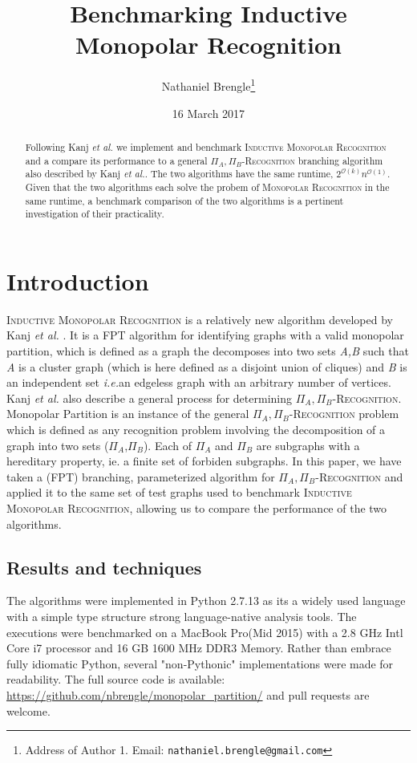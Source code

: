 \documentclass[11pt]{article}
\date{16 March 2017}
\title{Benchmarking Inductive Monopolar Recognition}
\author{{\sc Nathaniel Brengle}\thanks{Address of Author 1. Email: {\tt nathaniel.brengle@gmail.com}}}
\newcommand{\Oh}{{\mathcal O}}
\def\ie{{\em i.e.}}
\begin{document}
\maketitle

\begin{abstract}
Following Kanj \textit{et al.} \cite{ref1} we implement and benchmark \textsc{Inductive Monopolar Recognition} and a compare its performance to a general \textsc{$\Pi_A,\Pi_B$-Recognition} branching algorithm also described by Kanj \textit{et al.}. The two algorithms have the same runtime, $2^{\Oh(k)}n^{\Oh(1)}$. Given that the two algorithms each solve the probem of \textsc{Monopolar Recognition} in the same runtime, a benchmark comparison of the two algorithms is a pertinent investigation of their practicality.

\end{abstract}



\section{Introduction}
\label{sec:intro}
\textsc{Inductive Monopolar Recognition} is a relatively new algorithm developed by Kanj \textit{et al.} \cite{ref1}. It is a FPT algorithm for identifying graphs with a valid monopolar partition, which is defined as a graph the decomposes into two sets \textit{A,B} such that \textit{A} is a cluster graph (which is here defined as a disjoint union of cliques) and \textit{B} is an independent set \ie an edgeless graph with an arbitrary number of vertices. Kanj \textit{et al.} \cite{ref1} also describe a general process for determining \textsc{$\Pi_A,\Pi_B$-Recognition}. Monopolar Partition is an instance of the general \textsc{$\Pi_A,\Pi_B$-Recognition} problem which is defined as any recognition problem involving the decomposition of a graph into two sets ($\Pi_A$,$\Pi_B$). Each of $\Pi_A$ and $\Pi_B$ are subgraphs with a hereditary property, ie. a finite set of forbiden subgraphs. In this paper, we have taken a (FPT) branching, parameterized algorithm for \textsc{$\Pi_A,\Pi_B$-Recognition} and applied it to the same set of test graphs used to benchmark \textsc{Inductive Monopolar Recognition}, allowing us to compare the performance of the two algorithms. 

\subsection{Results and techniques}
\label{subsec:results}
The algorithms were implemented in Python 2.7.13 as its a widely used language with a simple type structure strong language-native analysis tools. The executions were benchmarked on a MacBook Pro(Mid 2015) with a 2.8 GHz Intl Core i7 processor and 16 GB 1600 MHz DDR3 Memory. Rather than embrace fully idiomatic Python, several "non-Pythonic" implementations were made for readability. The full source code is available: \url{https://github.com/nbrengle/monopolar_partition/} and pull requests are welcome.
\end{document}
